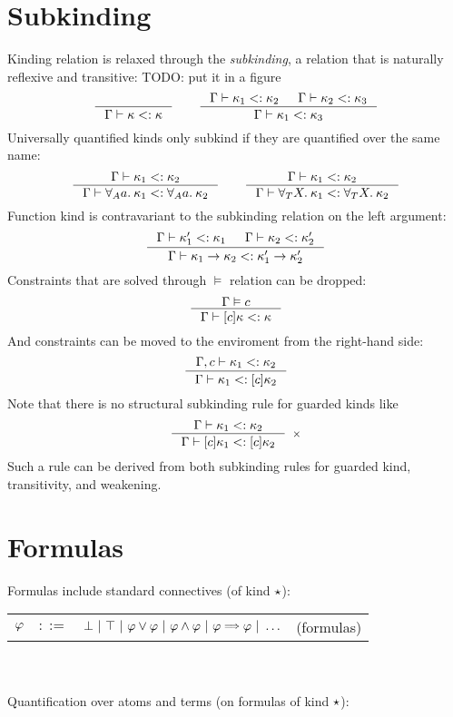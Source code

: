 \documentclass[english, mgr]{iithesis}
\renewcommand{\it}[1]{\textit{#1}}
\begin{document}
\section{Subkinding}
Kinding relation is relaxed through the \it{subkinding},
a relation that is naturally reflexive and transitive:
TODO: put it in a figure
$$
\inference{
}{
  \cEnv \vdash \kind \subkind \kind
}
\qquad
\inference{
  \cEnv \vdash \kind_1 \subkind \kind_2 &
  \cEnv \vdash \kind_2 \subkind \kind_3
}{
  \cEnv \vdash \kind_1 \subkind \kind_3
}
$$
Universally quantified kinds only subkind if they are quantified over the same name:
$$
\inference{
  \cEnv \vdash \kind_1 \subkind \kind_2
}{
  \cEnv \vdash \kForallAtom{\atomv} \kind_1 \subkind \kForallAtom{\atomv} \kind_2
}
\qquad
\inference{
  \cEnv \vdash \kind_1 \subkind \kind_2
}{
  \cEnv \vdash \kForallTerm{\termv} \kind_1 \subkind \kForallTerm{\termv} \kind_2
}
$$
Function kind is contravariant to the subkinding relation on the left argument:
$$
\inference{
  \cEnv \vdash \kind_1' \subkind \kind_1 &
  \cEnv \vdash \kind_2 \subkind \kind_2'
}{
  \cEnv \vdash \kind_1 \karrow \kind_2 \subkind \kind_1' \karrow \kind_2'
}
$$
Constraints that are solved through $\vDash$ relation can be dropped:
$$
\inference{
  \cEnv \vDash \constr
}{
  \cEnv \vdash \kGuard{\constr}\kind \subkind \kind
}
$$
And constraints can be moved to the enviroment from the right-hand side:
$$
\inference{
  \cEnv, \constr \vdash \kind_1 \subkind \kind_2
}{
  \cEnv \vdash \kind_1 \subkind \kGuard{\constr}\kind_2
}
$$
Note that there is no structural subkinding rule for guarded kinds like
$$
\inference{\cEnv \vdash \kind_1 \subkind \kind_2}{
  \cEnv \vdash \kGuard{\constr} \kind_1 \subkind \kGuard{\constr} \kind_2
}[\ensuremath{\times}]
$$
Such a rule can be derived from both subkinding rules for guarded kind,
transitivity, and weakening.

\section{Formulas}
Formulas include standard connectives (of kind $\star$):

\begin{tabular}{rrlr}
$\varphi$ & $::=$ & $\bot
               \bnfor \top
               \bnfor \formphi \vee \formphi
               \bnfor \formphi \wedge \formphi
               \bnfor \formphi \fImp \formphi
               \bnfor \ldots $ & (formulas)
\end{tabular}
\\ \\
Quantification over atoms and terms (on formulas of kind $\star$):
\end{document}
